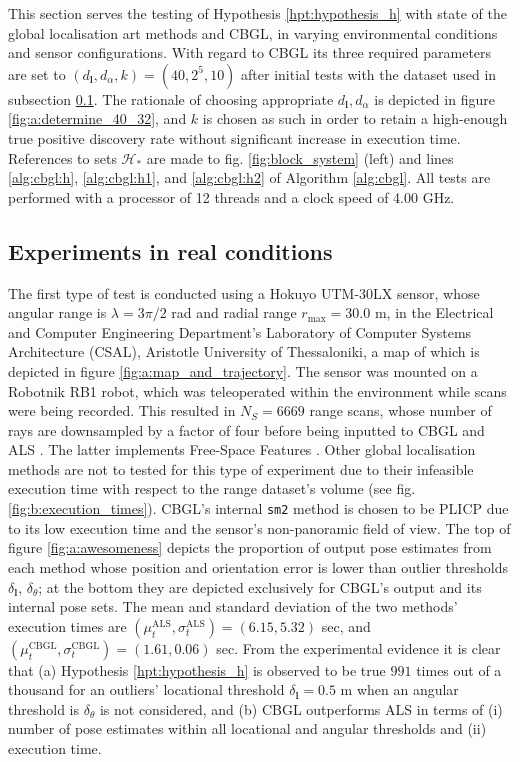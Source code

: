 This section serves the testing of Hypothesis \ref{hpt:hypothesis_h} with
state of the global localisation art methods and CBGL, in varying environmental
conditions and sensor configurations. With regard to CBGL its three required
parameters are set to $(d_{\bm{l}},d_{\alpha},k) = (40, 2^5, 10)$ after
initial tests with the dataset used in subsection \ref{subsec:exp_a}.
The rationale of choosing appropriate $d_{\bm{l}},d_{\alpha}$ is depicted in
figure \ref{fig:a:determine_40_32}, and $k$ is chosen as such in order to
retain a high-enough true positive discovery rate without significant increase
in execution time.
References to sets $\mathcal{H}_{\ast}$ are made to fig. \ref{fig:block_system}
(left) and lines \ref{alg:cbgl:h}, \ref{alg:cbgl:h1}, and \ref{alg:cbgl:h2} of
Algorithm \ref{alg:cbgl}. All tests are performed with a processor of 12
threads and a clock speed of 4.00 GHz.


\subsection{Experiments in real conditions}
\label{subsec:exp_a}

The first type of test is conducted using a Hokuyo UTM-30LX sensor, whose
angular range is $\lambda = 3\pi/2$ rad and radial range $r_{\max} = 30.0$ m,
in the  Electrical and Computer Engineering Department's Laboratory of Computer
Systems Architecture (CSAL), Aristotle University of Thessaloniki, a map of
which is depicted in figure \ref{fig:a:map_and_trajectory}. The sensor was
mounted on a Robotnik RB1 robot, which was teleoperated within the environment
while scans were being recorded.  This resulted in $N_{S}=6669$ range scans,
whose number of rays are downsampled by a factor of four before being inputted
to CBGL and ALS \cite{als_jp}. The latter implements Free-Space Features
\cite{als_eth}. Other global localisation methods are not to tested for this
type of experiment due to their infeasible execution time with respect to the
range dataset's volume (see fig. \ref{fig:b:execution_times}). CBGL's internal
\texttt{sm2} method is chosen to be PLICP \cite{Censi2008c} due to its low
execution time and the sensor's non-panoramic field of view. The top of figure
\ref{fig:a:awesomeness} depicts the proportion of output pose estimates from
each method whose position and orientation error is lower than outlier
thresholds $\delta_{\bm{l}}$, $\delta_{\theta}$; at the bottom they are
depicted exclusively for CBGL's output and its internal pose sets.
The mean and standard deviation of the two methods' execution times are
$(\mu_t^{\text{ALS}}, \sigma_t^{\text{ALS}}) = (6.15, 5.32)$ sec, and
$(\mu_t^{\text{CBGL}}, \sigma_t^{\text{CBGL}}) = (1.61, 0.06)$ sec. From the
experimental evidence it is clear that (a) Hypothesis \ref{hpt:hypothesis_h} is
observed to be true $991$ times out of a thousand for an outliers' locational
threshold $\delta_{\bm{l}} = 0.5$ m when an angular threshold is
$\delta_{\theta}$ is not considered, and (b) CBGL outperforms ALS in terms of
(i) number of pose estimates within all locational and angular thresholds and
(ii) execution time.

